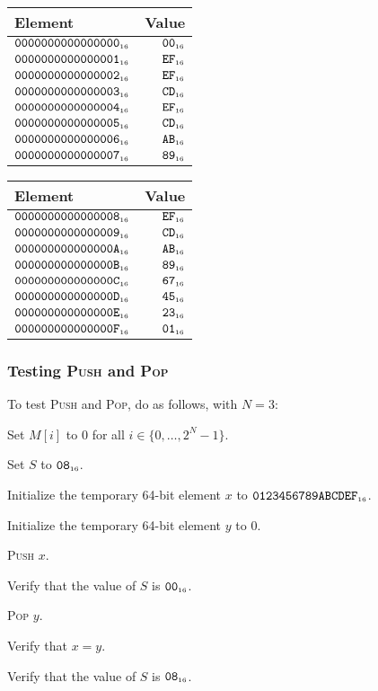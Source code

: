 \documentclass[a4paper,12pt]{article}
\newcommand{\num}[1]{\texttt{#1}}
\newcommand{\hex}[1]{\num{#1}_{\textup{\tiny 16}}}
\newcommand{\SP}{S}
\newcommand{\range}[2]{\{#1,\ldots,#2\}}
\newcommand{\proc}[1]{\textsc{#1}}
\begin{document}
\begin{center}
  \begin{tabular}{@{}lr@{}}
    \hline
    Element        & Value    \\
    \hline
    $\hex{0000000000000000}$ & $\hex{00}$ \\
    $\hex{0000000000000001}$ & $\hex{EF}$ \\
    $\hex{0000000000000002}$ & $\hex{EF}$ \\
    $\hex{0000000000000003}$ & $\hex{CD}$ \\
    $\hex{0000000000000004}$ & $\hex{EF}$ \\
    $\hex{0000000000000005}$ & $\hex{CD}$ \\
    $\hex{0000000000000006}$ & $\hex{AB}$ \\
    $\hex{0000000000000007}$ & $\hex{89}$ \\
    \hline
  \end{tabular}
  \hfil
  \begin{tabular}{@{}lr@{}}
    \hline
    Element        & Value    \\
    \hline
    $\hex{0000000000000008}$ & $\hex{EF}$ \\
    $\hex{0000000000000009}$ & $\hex{CD}$ \\
    $\hex{000000000000000A}$ & $\hex{AB}$ \\
    $\hex{000000000000000B}$ & $\hex{89}$ \\
    $\hex{000000000000000C}$ & $\hex{67}$ \\
    $\hex{000000000000000D}$ & $\hex{45}$ \\
    $\hex{000000000000000E}$ & $\hex{23}$ \\
    $\hex{000000000000000F}$ & $\hex{01}$ \\
    \hline
  \end{tabular}
\end{center}

\subsubsection{Testing \proc{Push} and \proc{Pop}}

To test \proc{Push} and \proc{Pop}, do as follows, with $N=3$:
\begin{stepnumbers}
\item Set $M[i]$ to 0 for all $i \in \range{0}{2^N-1}$.
\item Set $\SP$ to $\hex{08}$.
\item Initialize the temporary 64-bit element $x$ to $\hex{0123456789ABCDEF}$.
\item Initialize the temporary 64-bit element $y$ to $0$.
\item \proc{Push} $x$.
\item Verify that the value of $\SP$ is $\hex{00}$.
\item \proc{Pop} $y$.
\item Verify that $x=y$.
\item Verify that the value of $\SP$ is $\hex{08}$.
\end{stepnumbers}
\end{document}
